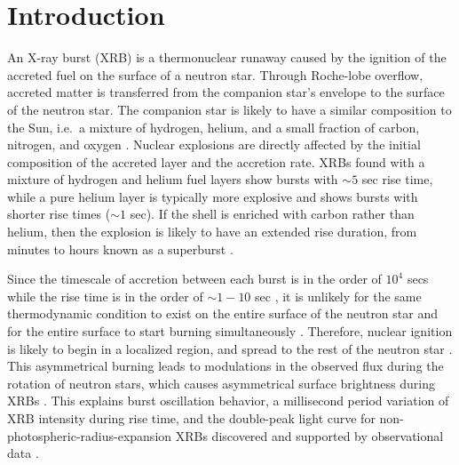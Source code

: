 \documentclass[preprint,times,tighten]{aastex631}
\newcommand{\MarginPar}[1]{
    \marginpar{\vskip-\baselineskip%
               \raggedright%
               \tiny\sffamily%
               {\color{red}\hrule%
               \smallskip%
               #1\par%
               \smallskip%
               \hrule}}%
}
\begin{document}

\section{Introduction}\label{Sec:Introduction}

An X-ray burst (XRB) is a thermonuclear runaway caused by the ignition of the accreted fuel on the surface of a neutron star. Through Roche-lobe overflow, accreted matter is transferred from the companion star's envelope to the surface of the neutron star. The companion star is likely to have a similar composition to the Sun, i.e.\ a mixture of hydrogen, helium, and a small fraction of carbon, nitrogen, and oxygen \citep{Galloway_2020_basics_of_xrb}. Nuclear explosions are directly affected by the initial composition of the accreted layer and the accretion rate. XRBs found with a mixture of hydrogen and helium fuel layers show bursts with $\sim 5$ sec rise time, while a pure helium layer is typically more explosive and shows bursts with shorter rise times ($\sim 1$ sec). If the shell is enriched with carbon rather than helium, then the explosion is likely to have an extended rise duration, from minutes to hours known as a superburst \citep{Kuulkers_2002,Cumming_2001,Gupta_2007}. 

Since the timescale of accretion between each burst is in the order of $10^4$ secs while the rise time is in the order of $\sim 1 - 10$ sec \citep{Parikh_2013}, it is unlikely for the same thermodynamic condition to exist on the entire surface of the neutron star and for the entire surface to start burning simultaneously \citep{Shara_1982}. Therefore, nuclear ignition is likely to begin in a localized region, and spread to the rest of the neutron star \citep{Spitkovsky_2002}. This asymmetrical burning leads to modulations in the observed flux during the rotation of neutron stars, which causes asymmetrical surface brightness during XRBs \citep{strohmayer_2009}. This explains burst oscillation behavior, a millisecond period variation of XRB intensity during rise time, and the double-peak light curve for non-photospheric-radius-expansion XRBs discovered and supported by observational data \citep{Altamirano_2010,Chakraborty_2014,Bhattacharyya_2006, Kaaret_2007,Smith_1997}.  
\end{document}
